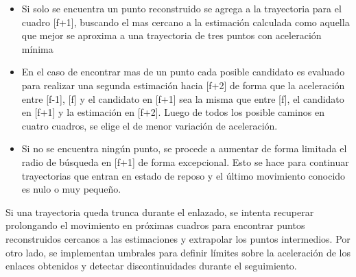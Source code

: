 \begin{itemize}

\item Si solo se encuentra un punto reconstruido se agrega a la trayectoria para el cuadro [f+1], buscando el mas cercano a la estimación calculada como aquella que mejor se aproxima a una trayectoria de tres puntos con aceleración mínima

\item En el caso de encontrar mas de un punto cada posible candidato es evaluado para realizar una segunda estimación hacia [f+2] de forma que la aceleración entre [f-1], [f] y el candidato en [f+1] sea la misma que entre [f], el candidato en [f+1] y la estimación en [f+2]. Luego de todos los posible caminos en cuatro cuadros, se elige el de menor variación de aceleración.

\item Si no se encuentra ningún punto, se procede a aumentar de forma limitada el radio de búsqueda en [f+1] de forma excepcional. Esto se hace para continuar trayectorias que entran en estado de reposo y el último movimiento conocido es nulo o muy pequeño.

\end{itemize}

Si una trayectoria queda trunca durante el enlazado, se intenta recuperar prolongando el movimiento en próximas cuadros para encontrar puntos reconstruidos cercanos a las estimaciones y extrapolar los puntos intermedios. Por otro lado, se implementan umbrales para definir límites sobre la aceleración de los enlaces obtenidos y detectar discontinuidades durante el seguimiento.


